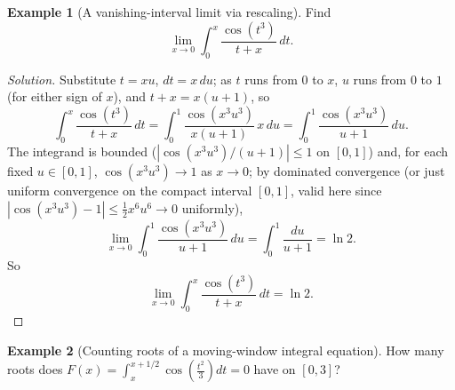 \documentclass[11pt]{article}
\theoremstyle{definition}
\newtheorem{example}{Example}[section]
\begin{document}
\begin{example}[A vanishing-interval limit via rescaling]
Find
\[
\lim_{x\to 0}\int_0^x\frac{\cos(t^3)}{t+x}\,dt.
\]
\end{example}

\begin{proof}[Solution]
Substitute $t=xu$, $dt=x\,du$; as $t$ runs from $0$ to $x$, $u$ runs from $0$ to $1$ (for either sign of $x$), and $t+x=x(u+1)$, so
\[
\int_0^x\frac{\cos(t^3)}{t+x}\,dt=\int_0^1\frac{\cos(x^3u^3)}{x(u+1)}\,x\,du=\int_0^1\frac{\cos(x^3u^3)}{u+1}\,du.
\]
The integrand is bounded ($|\cos(x^3u^3)/(u+1)|\le1$ on $[0,1]$) and, for each fixed $u\in[0,1]$, $\cos(x^3u^3)\to1$ as $x\to0$; by dominated convergence (or just uniform convergence on the compact interval $[0,1]$, valid here since $|\cos(x^3u^3)-1|\le \tfrac12 x^6u^6\to0$ uniformly),
\[
\lim_{x\to0}\int_0^1\frac{\cos(x^3u^3)}{u+1}\,du=\int_0^1\frac{du}{u+1}=\ln 2.
\]
So
\[
\boxed{\lim_{x\to 0}\int_0^x\frac{\cos(t^3)}{t+x}\,dt=\ln 2}.
\]
\end{proof}

\begin{example}[Counting roots of a moving-window integral equation]
How many roots does $F(x)=\displaystyle\int_x^{x+1/2}\cos\!\left(\frac{t^2}{3}\right)dt=0$ have on $[0,3]$?
\end{example}
\end{document}

